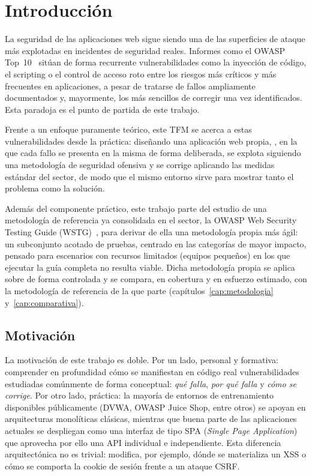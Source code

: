 \chapter{Introducción}
\label{cap:introduccion}

La seguridad de las aplicaciones web sigue siendo una de
las superficies de ataque más explotadas en incidentes de seguridad reales.
Informes como el OWASP Top~10~ sitúan de forma recurrente
vulnerabilidades como la inyección de código, el scripting o el
control de acceso roto entre los riesgos más críticos y más frecuentes en
aplicaciones, a pesar de tratarse de fallos ampliamente
documentados y, mayormente, los más sencillos de corregir una vez
identificados. Esta paradoja es el punto de partida de este trabajo.

Frente a un enfoque puramente teórico, este TFM
se acerca a estas vulnerabilidades desde la práctica: diseñando una
aplicación web propia, \breachlab, en la que cada fallo se presenta en la misma
de forma deliberada, se explota siguiendo una metodología de seguridad ofensiva
y se corrige aplicando las medidas estándar del sector, de modo que el
mismo entorno sirve para mostrar tanto el problema como la solución.

Además del componente práctico, este trabajo parte del estudio de una
metodología de referencia ya consolidada en el sector, la OWASP Web
Security Testing Guide (WSTG)~, para derivar de ella una
metodología propia más ágil: un subconjunto acotado de pruebas, centrado en
las categorías de mayor impacto, pensado para escenarios con recursos
limitados (equipos pequeños) en los que ejecutar la guía completa no
resulta viable. Dicha metodología propia se aplica sobre \breachlab de forma
controlada y se compara, en cobertura y en esfuerzo estimado, con la
metodología de referencia de la que parte (capítulos~\ref{cap:metodologia}
y~\ref{cap:comparativa}).

\section{Motivación}

La motivación de este trabajo es doble. Por un lado, personal y formativa:
comprender en profundidad cómo se manifiestan en código real vulnerabilidades
estudiadas comúnmente de forma conceptual: \emph{qué falla}, \emph{por qué
falla} y \emph{cómo se corrige}. Por otro lado,
práctica: la mayoría de entornos de entrenamiento disponibles públicamente
(DVWA, OWASP Juice Shop, entre otros) se apoyan en arquitecturas monolíticas
clásicas, mientras que buena parte de las aplicaciones actuales se despliegan
como una interfaz de tipo SPA (\emph{Single Page Application}) que aprovecha por ello
una API individual e independiente. Esta diferencia arquitectónica no es trivial:
modifica, por ejemplo, dónde se materializa un XSS o cómo se comporta la cookie de sesión
frente a un ataque CSRF.

